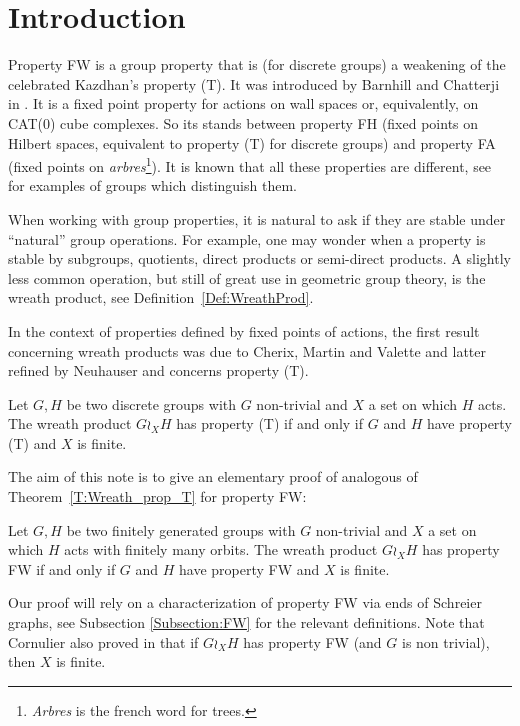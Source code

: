 %
%
%
%
%
%
%
%
%
%
\section{Introduction}
%
%
%
%
%
Property FW is a group property that is (for discrete groups) a weakening of the celebrated Kazdhan's property (T). It was introduced by Barnhill and Chatterji in \cite{Barnhill2008}. It is a fixed point property for actions on wall spaces or, equivalently, on CAT(0) cube complexes. So its stands between property FH (fixed points on Hilbert spaces, equivalent to property (T) for discrete groups) and property FA (fixed points on \emph{arbres}\footnote{\emph{Arbres} is the french word for trees.}). It is known that all these properties are different, see  \cite{Cornulier2013} for examples of groups which distinguish them.

When working with group properties, it is natural to ask if they are stable under ``natural'' group operations. For example, one may wonder when a property is stable by subgroups, quotients, direct products or semi-direct products. 
A slightly less common operation, but still of great use in geometric group theory, is the wreath product, see Definition~\ref{Def:WreathProd}.

In the context of properties defined by fixed points of actions, the first result concerning wreath products was due to Cherix, Martin and Valette and latter refined by Neuhauser and concerns property (T).
%
%
\begin{thm} \label{T:Wreath_prop_T}
Let $G,H$ be two discrete groups with $G$ non-trivial and $X$ a set on which $H$ acts. The wreath product $G \wr_X H$ has property (T) if and only if $G$ and $H$ have property (T) and $X$ is finite.
\end{thm}
%
%
The aim of this note is to give an elementary proof of analogous of Theorem~\ref{T:Wreath_prop_T} for property FW:
%
%
\begin{thm}\label{Thm:Main}
Let $G,H$ be two finitely generated groups with $G$ non-trivial and $X$ a set on which $H$ acts with finitely many orbits. The wreath product $G \wr_X H$ has property FW if and only if $G$ and $H$ have property FW and $X$ is finite.
\end{thm}
%
%
Our proof will rely on a characterization of property FW via ends of Schreier graphs, see Subsection \ref{Subsection:FW} for the relevant definitions.
Note that Cornulier also proved in \cite{Cornulier2013} that if $G\wr_XH$ has property FW (and $G$ is non trivial), then $X$ is finite.

